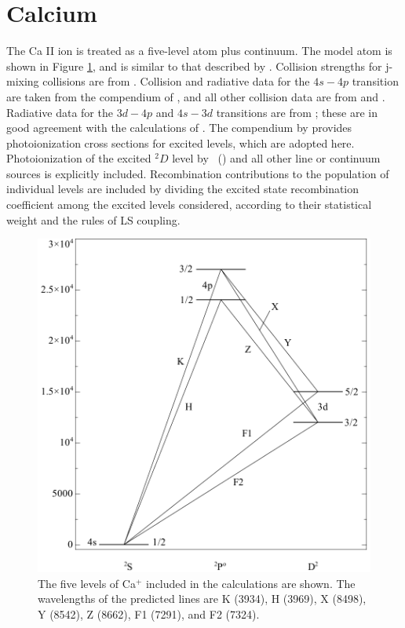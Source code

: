 \section{Calcium}

The Ca II ion is treated as a five-level atom plus continuum.  The model
atom is shown in Figure \ref{fig:CaIIEnergyLevels}, and is similar to that described by \citet{Shine1974}.  Collision strengths for j-mixing collisions are from \citet{Saraph1970}.  Collision and radiative data for the $4s - 4p$ transition are taken
from the compendium of \citet{Mendoza1983}, and all other collision data are
from \citet{Chidichimo1981} and \citet{Saraph1970}.  Radiative data for the $3d - 4p$
and $4s - 3d$ transitions are from
\citet{BlackWeisheit1972}; these
are in good agreement with the calculations of \citet{Osterbrock1951}.  The
compendium by \citet{Shine1974} provides photoionization cross sections
for excited levels, which are adopted here.  Photoionization of the excited
$^2D$ level by \la\ (\citealp{Wyse1941}) and all other line or continuum sources is
explicitly included.  Recombination contributions to the population of
individual levels are included by dividing the excited state recombination
coefficient among the excited levels considered, according to their
statistical weight and the rules of LS coupling.

\begin{figure}
\centering
\includegraphics[scale=0.7]{CaIIEnergyLevels}
\caption[CaII model atom]{The five levels of Ca$^+$ included in the calculations are shown.
The wavelengths of the predicted lines are K (3934), H (3969), X (8498),
Y (8542), Z (8662), F1 (7291), and F2 (7324).}
\label{fig:CaIIEnergyLevels}
\end{figure}

